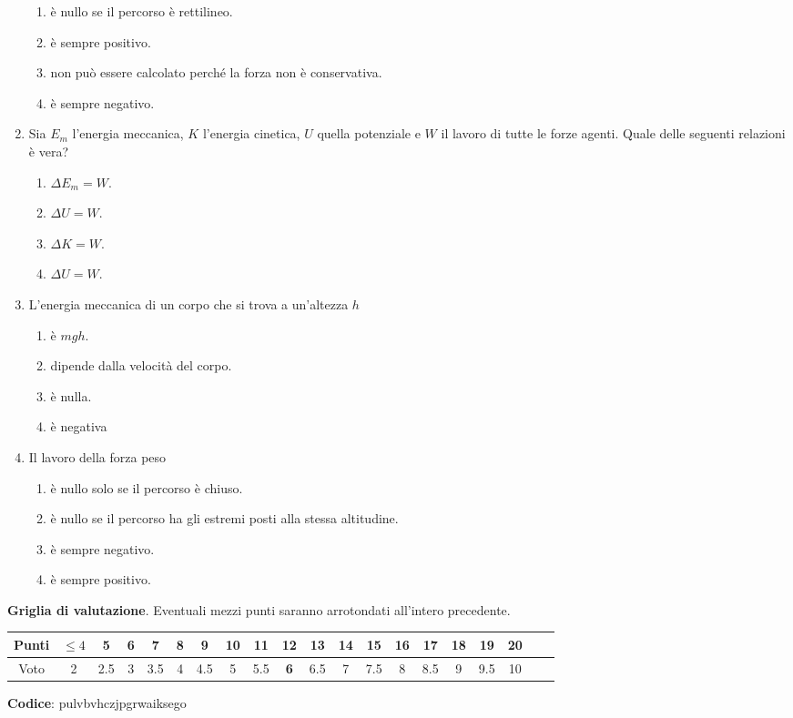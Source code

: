 \documentclass{article}
\begin{document}
\begin{enumerate}
\begin{enumerate}[label=\Alph*.]
    \item è nullo se il percorso è rettilineo.
    \item è sempre positivo.
    \item non può essere calcolato perché la forza non è conservativa.
    \item è sempre negativo.
  \end{enumerate}
  \item Sia $E_m$ l'energia meccanica, $K$ l'energia cinetica, $U$ quella potenziale e $W$ il lavoro di tutte le forze agenti. Quale delle seguenti relazioni è vera?
  \begin{enumerate}[label=\Alph*.]
    \item $\Delta E_m=W$.
    \item $\Delta U=W$.
    \item $\Delta K=W.$
    \item $\Delta U=W$.
  \end{enumerate}
  \item L'energia meccanica di un corpo che si trova a un'altezza $h$
  \begin{enumerate}[label=\Alph*.]
    \item è $mgh$.
    \item dipende dalla velocità del corpo.
    \item è nulla.
    \item è negativa
  \end{enumerate}
  \item Il lavoro della forza peso
  \begin{enumerate}[label=\Alph*.]
    \item è nullo solo se il percorso è chiuso.
    \item è nullo se il percorso ha gli estremi posti alla stessa altitudine.
    \item è sempre negativo.
    \item è sempre positivo.
  \end{enumerate}
\end{enumerate}








\newpage \maketitle \centering \textbf{Griglia di valutazione}. Eventuali mezzi punti saranno arrotondati all'intero precedente. \begin{table}[h]     \centering \begin{tabular}{|c|c|c|c|c|c|c|c|c|c|c|c|c|c|c|c|c|c|c|c|} \hline Punti &  $\leq 4$ & 5 & 6 & 7 & 8 & 9 & 10 & 11 & \textbf{12} & 13 & 14 & 15 & 16 & 17 & 18 & 19 & 20 \\ \hline Voto & 2 & 2.5 & 3 & 3.5 & 4 & 4.5 & 5 & 5.5 & \textbf{6} & 6.5 & 7 & 7.5 & 8 & 8.5 & 9 & 9.5 & 10 \\ \hline \end{tabular} \end{table}
\textbf{Codice}: pulvbvhczjpgrwaiksego
\end{document}

